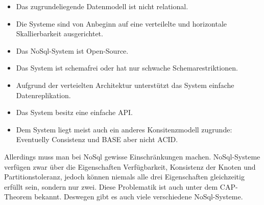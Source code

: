 \begin{itemize}
    \item Das zugrundeliegende Datenmodell ist nicht relational.
    \item Die Systeme sind von Anbeginn auf eine verteilelte und horizontale
        Skallierbarkeit ausgerichtet.
    \item Das NoSql-System ist Open-Source.
    \item Das System ist schemafrei oder hat nur schwache Schemarestriktionen.
    \item Aufgrund der verteielten Architektur unterstützt das System einfache
        Datenreplikation.
    \item Das System besitz eine einfache \gls{API}.
    \item Dem System liegt meist auch ein anderes Konsitenzmodell zugrunde:
        Eventuelly Consistenz und \gls{BASE} aber nicht \gls{ACID}.
\end{itemize}

Allerdings muss man bei NoSql gewisse Einschränkungen machen. NoSql-Systeme
verfügen zwar über die Eigenschaften Verfügbarkeit, Konsistenz der Knoten und
Partitionstoleranz, jedoch können niemals alle drei Eigenschaften gleichzeitig
erfüllt sein, sondern nur zwei. Diese Problematik ist auch unter
dem \gls{CAP}-Theorem bekannt. Deswegen gibt es auch viele verschiedene
NoSql-Systeme.

